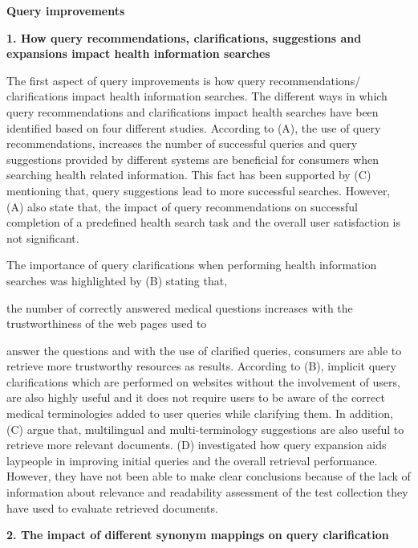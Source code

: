 \documentclass[]{article}
\begin{document}
\textbf{Query improvements}


\textbf{1. How query recommendations, clarifications, suggestions and expansions impact health information searches}


The first aspect of query improvements is how query recommendations/ clarifications impact health information searches. The different ways in which query recommendations and clarifications impact health searches have been identified based on four different studies. According to (A), the use of query recommendations, increases the number of successful queries and query suggestions provided by different systems are beneficial for consumers when searching health related information. This fact has been supported by (C) mentioning that, query suggestions lead to more successful searches.  However, (A) also state that, the impact of query recommendations on successful completion of a predefined health search task and the overall user satisfaction is not significant. 

The importance of query clarifications when performing health information searches was highlighted by (B) stating that, 

the number of correctly answered medical questions increases with the trustworthiness of the web pages used to 

answer the questions and with the use of clarified queries, consumers are able to retrieve more trustworthy resources as results. According to (B), implicit query clarifications which are performed on websites without the involvement of users, are also highly useful and it does not require users to be aware of the correct medical terminologies added to user queries while clarifying them. In addition, (C) argue that, multilingual and multi-terminology suggestions are also useful to retrieve more relevant documents. (D) investigated how query expansion aids laypeople in improving initial queries and the overall retrieval performance. However, they have not been able to make clear conclusions because of the lack of information about relevance and readability assessment of the test collection they have used to evaluate retrieved documents. 

\textbf{2. The impact of different synonym mappings on query clarification}
\end{document}
